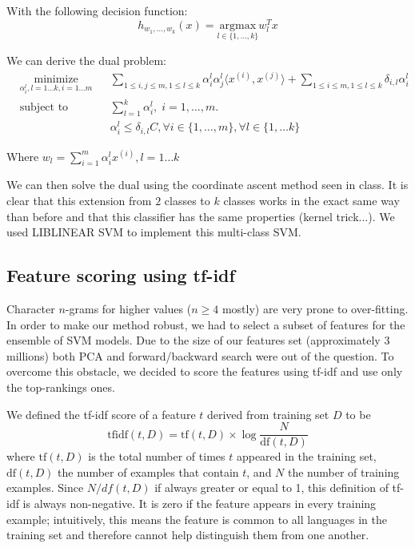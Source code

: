 \documentclass{article}
\begin{document}
With the following decision function: $$h_{w_1, \ldots, w_k}(x) = \underset{l\in\{1,\ldots,k\}}{\mathrm{argmax}} w_l^Tx$$

We can derive the dual problem:
\begin{equation*}
\begin{aligned}
& \underset{\alpha_i^l, l=1\ldots k, i = 1\ldots m}{\text{minimize}}
& & \sum\limits_{1\leq i,j \leq m, 1\leq l \leq k} \alpha_i^l \alpha_j^l \langle x^{(i)}, x^{(j)}\rangle + \sum\limits_{1\leq i \leq m, 1\leq l \leq k} \delta_{i,l} \alpha_i^l\\
& \text{subject to}
& & \sum\limits_{l=1}^k \alpha_i^l, \; i = 1, \ldots, m. \\
& & & \alpha_i^l \leq \delta_{i,l}C, \forall i \in \{1, \ldots, m\}, \forall l \in \{1, \ldots k \}
\end{aligned}
\end{equation*}

Where $w_l = \sum\limits_{i=1}^m \alpha_i^l x^{(i)}, l=1\ldots k$

We can then solve the dual using the coordinate ascent method seen in class. It is clear that this extension from $2$ classes to $k$ classes works in the exact same way than before and that this classifier has the same properties (kernel trick...). We used LIBLINEAR SVM to implement this multi-class SVM.

\subsection{Feature scoring using tf-idf}

Character $n$-grams for higher values ($n\geq 4$ mostly) are very prone to over-fitting. In order to make our method robust, we had to select a subset of features for the ensemble of SVM models. Due to the size of our features set (approximately $3$ millions) both PCA and forward/backward search were out of the question. To overcome this obstacle, we decided to score the features using tf-idf and use only the top-rankings ones.

We defined the tf-idf score of a feature $t$ derived from training set $D$ to be
\begin{equation}
\mathrm{tfidf}(t,D) = \mathrm{tf}(t,D) \times \log \frac{N}{\mathrm{df}(t,D)}
\end{equation}
where $\mathrm{tf}(t,D)$ is the total number of times $t$ appeared in the training set, $\mathrm{df}(t,D)$ the number of examples that contain $t$, and ${N}$  the number of training examples. Since $N/df(t,D)$ if always greater or equal to 1, this definition of tf-idf is always non-negative. It is zero if the feature appears in every training example; intuitively, this means the feature is common to all languages in the training set and therefore cannot help distinguish them from one another.
\end{document}
